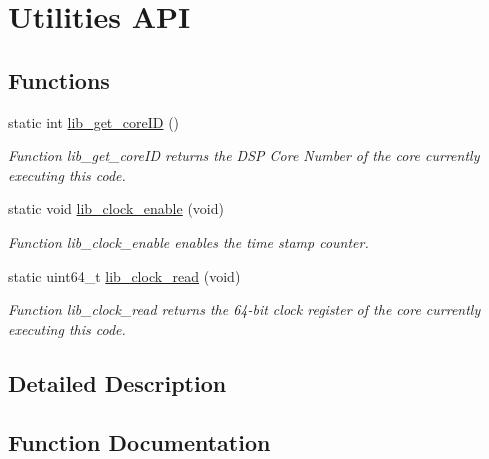 \hypertarget{group__libarch__utils}{}\section{Utilities A\+P\+I}
\label{group__libarch__utils}
\subsection*{Functions}
\begin{DoxyCompactItemize}
\item 
static int \hyperlink{group__libarch__utils_ga2dc4317fe6b9d654c7ec71eba4704bcd}{lib\+\_\+get\+\_\+core\+I\+D} ()
\begin{DoxyCompactList}\small\item\em Function lib\+\_\+get\+\_\+core\+I\+D returns the D\+S\+P Core Number of the core currently executing this code. \end{DoxyCompactList}\item 
static void \hyperlink{group__libarch__utils_ga096530c8e2e792e83ba9c9823cc6294b}{lib\+\_\+clock\+\_\+enable} (void)
\begin{DoxyCompactList}\small\item\em Function lib\+\_\+clock\+\_\+enable enables the time stamp counter. \end{DoxyCompactList}\item 
static uint64\+\_\+t \hyperlink{group__libarch__utils_gaf9a1a5dcb6e29a015c25b6e4b28623f5}{lib\+\_\+clock\+\_\+read} (void)
\begin{DoxyCompactList}\small\item\em Function lib\+\_\+clock\+\_\+read returns the 64-\/bit clock register of the core currently executing this code. \end{DoxyCompactList}\end{DoxyCompactItemize}


\subsection{Detailed Description}


\subsection{Function Documentation}
\hypertarget{group__libarch__utils_ga096530c8e2e792e83ba9c9823cc6294b}{}
